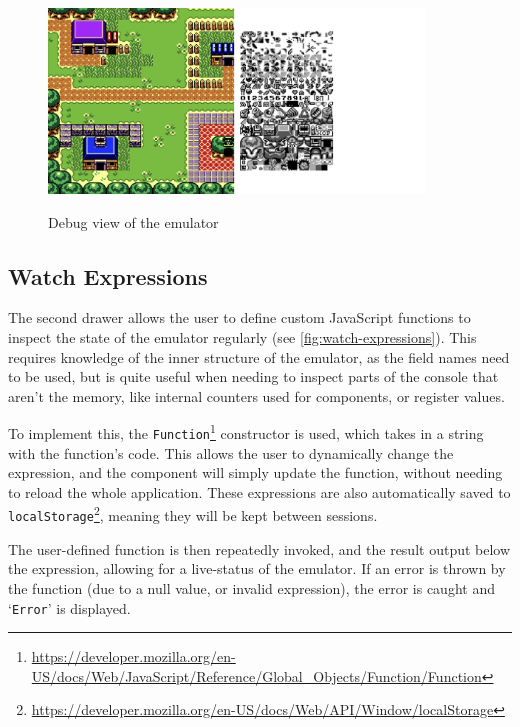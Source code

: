 \documentclass[11pt]{report}
\newcommand{\ftnt}[1]{\footnote{\url{#1}}}
\begin{document}
\begin{figure}[h]
    \centering
    \includegraphics[width=10cm]{images/debug-view}\\
    \caption{Debug view of the emulator}
    \label{fig:debug-view}
\end{figure}

\subsection{Watch Expressions}

The second drawer allows the user to define custom JavaScript functions to inspect the state of the emulator regularly (see \ref{fig:watch-expressions}). This requires knowledge of the inner structure of the emulator, as the field names need to be used, but is quite useful when needing to inspect parts of the console that aren't the memory, like internal counters used for components, or register values. 

To implement this, the \texttt{Function}\ftnt{https://developer.mozilla.org/en-US/docs/Web/JavaScript/Reference/Global_Objects/Function/Function} constructor is used, which takes in a string with the function's code. This allows the user to dynamically change the expression, and the component will simply update the function, without needing to reload the whole application. These expressions are also automatically saved to \texttt{localStorage}\ftnt{https://developer.mozilla.org/en-US/docs/Web/API/Window/localStorage}, meaning they will be kept between sessions.

The user-defined function is then repeatedly invoked, and the result output below the expression, allowing for a live-status of the emulator. If an error is thrown by the function (due to a null value, or invalid expression), the error is caught and `\texttt{Error}' is displayed.
\end{document}
